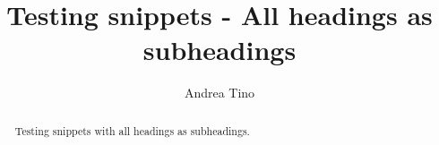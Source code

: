 \documentclass{article}
\begin{document}
\title{Testing snippets - All headings as subheadings}
\author{Andrea Tino}

\maketitle

\begin{abstract}
Testing snippets with all headings as subheadings.
\end{abstract}


\end{document}
